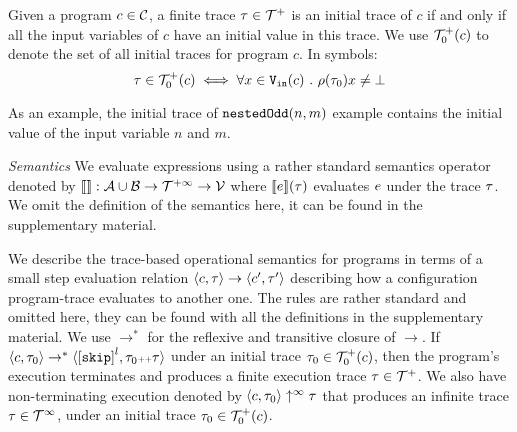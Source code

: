     \begin{defn}
        \label{def:initial_trace}
        Given a program $c\in\mathcal{C}$, a finite trace $\mathtt{\tau}\in\mathcal{T}^{+}$ is an initial trace of $c$ if and only if all the input variables of $c$ have an initial value in this trace.      We use $\mathcal{T}^{+}_0(c)$ to denote the set of all initial traces for program $c$. In symbols:
        \[
        \mathtt{\tau} \in \mathcal{T}^{+}_0(c) \iff 
        \forall x \in {\ensuremath{\mathtt{V_{\mathtt{in}}}}}(c) ~.~ \rho(\mathtt{\tau}_0) x \neq \bot
        \]
        \end{defn}
        As an example, the initial trace of $\mathtt{nestedOdd}(n, m)$ example contains the initial value of the input variable $n$ and $m$.


\emph{Semantics}
We evaluate expressions using a rather standard semantics operator denoted by
$\llbracket  \rrbracket : \mathcal{A} \cup \mathcal{B} \to \mathcal{T}^{+\infty} \to \mathcal{V}$ where
$\llbracket e \rrbracket(\mathtt{\tau})$ evaluates $e$ under the trace $\mathtt{\tau}$. We omit the definition of the semantics here, it can be found in the supplementary material.

We describe the trace-based operational semantics for programs in terms of a small step evaluation relation $\langle c, \mathtt{\tau} \rangle \to \langle c', \mathtt{\tau}' \rangle$ describing how a configuration program-trace evaluates to another
one.
The rules are rather standard and omitted here, they can be found with all the definitions in the supplementary material.
We use $\to^*$ for the reflexive and transitive closure of $\to$. 
If $\config{c, \trace_0} \rightarrow^{*} \config{\clabel{\eskip}^l, \trace_0 \tracecat \trace}$ under an initial trace 
$\mathtt{\tau}_0 \in \mathcal{T}^{+}_0(c)$,
then the program's execution terminates and produces a finite execution trace $\mathtt{\tau} \in \mathcal{T}^{+}$. We also have non-terminating execution denoted by $\langle c, \mathtt{\tau}_0 \rangle \uparrow^{\infty} \mathtt{\tau}$ that produces an infinite trace $\mathtt{\tau} \in \mathcal{T}^{\infty}$, under an initial trace 
$\mathtt{\tau}_0 \in \mathcal{T}^{+}_0(c)$.
